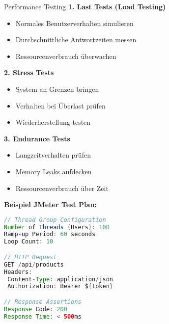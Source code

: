 \begin{KR}{Performance Testing}
\textbf{1. Last Tests (Load Testing)}
\begin{itemize}
   \item Normales Benutzerverhalten simulieren
   \item Durchschnittliche Antwortzeiten messen
   \item Ressourcenverbrauch überwachen
\end{itemize}

\textbf{2. Stress Tests}
\begin{itemize}
   \item System an Grenzen bringen
   \item Verhalten bei Überlast prüfen
   \item Wiederherstellung testen
\end{itemize}

\textbf{3. Endurance Tests}
\begin{itemize}
   \item Langzeitverhalten prüfen
   \item Memory Leaks aufdecken
   \item Ressourcenverbrauch über Zeit
\end{itemize}

\textbf{Beispiel JMeter Test Plan:}
\begin{lstlisting}[language=Java, style=basesmol]
// Thread Group Configuration
Number of Threads (Users): 100
Ramp-up Period: 60 seconds
Loop Count: 10

// HTTP Request
GET /api/products
Headers:
 Content-Type: application/json
 Authorization: Bearer ${token}

// Response Assertions
Response Code: 200
Response Time: < 500ms
\end{lstlisting}
\end{KR}

